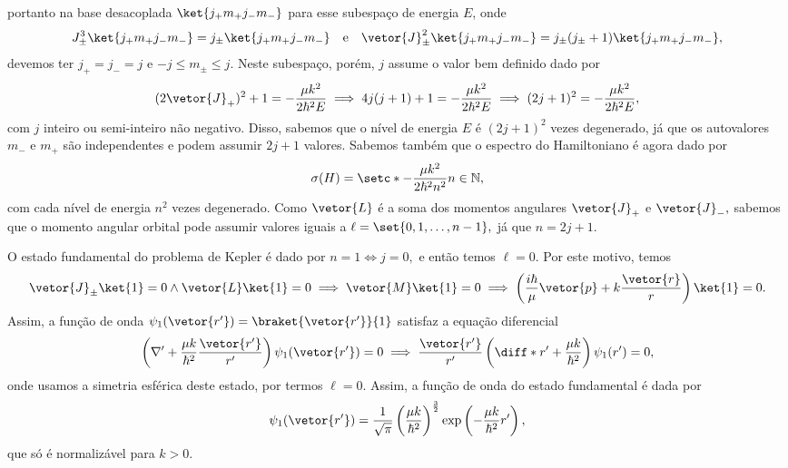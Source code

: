 portanto na base desacoplada \(\ket{j_+ m_+ j_- m_-}\) para esse subespaço de energia \(E\), onde
\begin{equation*}
   J_\pm^3\ket{j_+ m_+ j_- m_-} = j_{\pm} \ket{j_+ m_+ j_- m_-}
   \quad\text{e}\quad
   \vetor{J}_\pm^2\ket{j_+ m_+ j_- m_-} = j_{\pm}(j_\pm + 1)\ket{j_+ m_+ j_- m_-},
\end{equation*}
devemos ter \(j_+ = j_- = j\) e \(-j \leq m_\pm \leq j.\) Neste subespaço, porém, \(j\) assume o valor bem definido dado por
\begin{equation*}
   (2\vetor{J}_+)^2 + 1 = -\frac{\mu k^2}{2\hbar^2 E} \implies 4 j(j+1) + 1 = -\frac{\mu k^2}{2\hbar^2 E} \implies (2j + 1)^2 = -\frac{\mu k^2}{2\hbar^2 E},
\end{equation*}
com \(j\) inteiro ou semi-inteiro não negativo. Disso, sabemos que o nível de energia \(E\) é \((2j + 1)^2\) vezes degenerado, já que os autovalores \(m_-\) e \(m_+\) são independentes e podem assumir \(2j + 1\) valores. Sabemos também que o espectro do Hamiltoniano é agora dado por
\begin{equation*}
   \sigma(H) = \setc*{-\frac{\mu k^2}{2 \hbar^2 n^2}}{n \in \mathbb{N}},
\end{equation*}
com cada nível de energia \(n^2\) vezes degenerado. Como \(\vetor{L}\) é a soma dos momentos angulares \(\vetor{J}_+\) e \(\vetor{J}_-,\) sabemos que o momento angular orbital pode assumir valores iguais a \(\ell = \set{0, 1,\dots, n-1},\) já que \(n = 2j + 1.\)

O estado fundamental do problema de Kepler é dado por \(n = 1 \iff j = 0,\) e então temos \(\ell = 0.\) Por este motivo, temos 
\begin{equation*}
   \vetor{J}_\pm \ket{1} = 0 \land \vetor{L}\ket{1} = 0 \implies \vetor{M} \ket{1} = 0 \implies \left(\frac{i \hbar}{\mu}\vetor{p} + k \frac{\vetor{r}}{r}\right) \ket{1} = 0.
\end{equation*}
Assim, a função de onda \(\psi_{1}(\vetor{r'}) = \braket{\vetor{r'}}{1}\) satisfaz a equação diferencial
\begin{equation*}
   \left(\nabla' + \frac{\mu k}{\hbar^2} \frac{\vetor{r'}}{r'}\right)\psi_1(\vetor{r'}) = 0 \implies \frac{\vetor{r'}}{r'}\left(\diff*{}{r'} + \frac{\mu k}{\hbar^2}\right)\psi_1(r') = 0,
\end{equation*}
onde usamos a simetria esférica deste estado, por termos \(\ell = 0.\) Assim, a função de onda do estado fundamental é dada por
\begin{equation*}
   \psi_1(\vetor{r'}) = \frac{1}{\sqrt{\pi}}\left(\frac{\mu k}{\hbar^2}\right)^{\frac32}\exp\left(-\frac{\mu k}{\hbar^2}r'\right),
\end{equation*}
que só é normalizável para \(k > 0.\)

